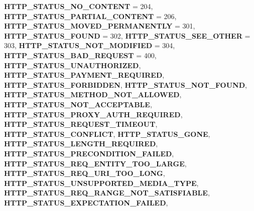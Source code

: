 \begin{DoxyCompactItemize}
\newline
{\bfseries H\+T\+T\+P\+\_\+\+S\+T\+A\+T\+U\+S\+\_\+\+N\+O\+\_\+\+C\+O\+N\+T\+E\+NT} = 204, 
{\bfseries H\+T\+T\+P\+\_\+\+S\+T\+A\+T\+U\+S\+\_\+\+P\+A\+R\+T\+I\+A\+L\+\_\+\+C\+O\+N\+T\+E\+NT} = 206, 
{\bfseries H\+T\+T\+P\+\_\+\+S\+T\+A\+T\+U\+S\+\_\+\+M\+O\+V\+E\+D\+\_\+\+P\+E\+R\+M\+A\+N\+E\+N\+T\+LY} = 301, 
{\bfseries H\+T\+T\+P\+\_\+\+S\+T\+A\+T\+U\+S\+\_\+\+F\+O\+U\+ND} = 302, 
\newline
{\bfseries H\+T\+T\+P\+\_\+\+S\+T\+A\+T\+U\+S\+\_\+\+S\+E\+E\+\_\+\+O\+T\+H\+ER} = 303, 
{\bfseries H\+T\+T\+P\+\_\+\+S\+T\+A\+T\+U\+S\+\_\+\+N\+O\+T\+\_\+\+M\+O\+D\+I\+F\+I\+ED} = 304, 
{\bfseries H\+T\+T\+P\+\_\+\+S\+T\+A\+T\+U\+S\+\_\+\+B\+A\+D\+\_\+\+R\+E\+Q\+U\+E\+ST} = 400, 
{\bfseries H\+T\+T\+P\+\_\+\+S\+T\+A\+T\+U\+S\+\_\+\+U\+N\+A\+U\+T\+H\+O\+R\+I\+Z\+ED}, 
\newline
{\bfseries H\+T\+T\+P\+\_\+\+S\+T\+A\+T\+U\+S\+\_\+\+P\+A\+Y\+M\+E\+N\+T\+\_\+\+R\+E\+Q\+U\+I\+R\+ED}, 
{\bfseries H\+T\+T\+P\+\_\+\+S\+T\+A\+T\+U\+S\+\_\+\+F\+O\+R\+B\+I\+D\+D\+EN}, 
{\bfseries H\+T\+T\+P\+\_\+\+S\+T\+A\+T\+U\+S\+\_\+\+N\+O\+T\+\_\+\+F\+O\+U\+ND}, 
{\bfseries H\+T\+T\+P\+\_\+\+S\+T\+A\+T\+U\+S\+\_\+\+M\+E\+T\+H\+O\+D\+\_\+\+N\+O\+T\+\_\+\+A\+L\+L\+O\+W\+ED}, 
\newline
{\bfseries H\+T\+T\+P\+\_\+\+S\+T\+A\+T\+U\+S\+\_\+\+N\+O\+T\+\_\+\+A\+C\+C\+E\+P\+T\+A\+B\+LE}, 
{\bfseries H\+T\+T\+P\+\_\+\+S\+T\+A\+T\+U\+S\+\_\+\+P\+R\+O\+X\+Y\+\_\+\+A\+U\+T\+H\+\_\+\+R\+E\+Q\+U\+I\+R\+ED}, 
{\bfseries H\+T\+T\+P\+\_\+\+S\+T\+A\+T\+U\+S\+\_\+\+R\+E\+Q\+U\+E\+S\+T\+\_\+\+T\+I\+M\+E\+O\+UT}, 
{\bfseries H\+T\+T\+P\+\_\+\+S\+T\+A\+T\+U\+S\+\_\+\+C\+O\+N\+F\+L\+I\+CT}, 
\newline
{\bfseries H\+T\+T\+P\+\_\+\+S\+T\+A\+T\+U\+S\+\_\+\+G\+O\+NE}, 
{\bfseries H\+T\+T\+P\+\_\+\+S\+T\+A\+T\+U\+S\+\_\+\+L\+E\+N\+G\+T\+H\+\_\+\+R\+E\+Q\+U\+I\+R\+ED}, 
{\bfseries H\+T\+T\+P\+\_\+\+S\+T\+A\+T\+U\+S\+\_\+\+P\+R\+E\+C\+O\+N\+D\+I\+T\+I\+O\+N\+\_\+\+F\+A\+I\+L\+ED}, 
{\bfseries H\+T\+T\+P\+\_\+\+S\+T\+A\+T\+U\+S\+\_\+\+R\+E\+Q\+\_\+\+E\+N\+T\+I\+T\+Y\+\_\+\+T\+O\+O\+\_\+\+L\+A\+R\+GE}, 
\newline
{\bfseries H\+T\+T\+P\+\_\+\+S\+T\+A\+T\+U\+S\+\_\+\+R\+E\+Q\+\_\+\+U\+R\+I\+\_\+\+T\+O\+O\+\_\+\+L\+O\+NG}, 
{\bfseries H\+T\+T\+P\+\_\+\+S\+T\+A\+T\+U\+S\+\_\+\+U\+N\+S\+U\+P\+P\+O\+R\+T\+E\+D\+\_\+\+M\+E\+D\+I\+A\+\_\+\+T\+Y\+PE}, 
{\bfseries H\+T\+T\+P\+\_\+\+S\+T\+A\+T\+U\+S\+\_\+\+R\+E\+Q\+\_\+\+R\+A\+N\+G\+E\+\_\+\+N\+O\+T\+\_\+\+S\+A\+T\+I\+S\+F\+I\+A\+B\+LE}, 
{\bfseries H\+T\+T\+P\+\_\+\+S\+T\+A\+T\+U\+S\+\_\+\+E\+X\+P\+E\+C\+T\+A\+T\+I\+O\+N\+\_\+\+F\+A\+I\+L\+ED}, 

\end{DoxyCompactItemize}
